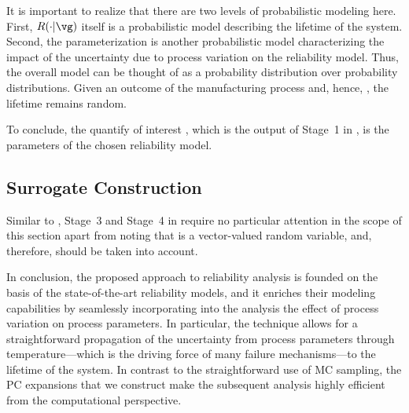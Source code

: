 \begin{remark} 
It is important to realize that there are two levels of probabilistic modeling
here. First, $R(\cdot | \vg)$ itself is a probabilistic model describing the
lifetime of the system. Second, the parameterization \vg is another
probabilistic model characterizing the impact of the uncertainty due to process
variation on the reliability model. Thus, the overall model can be thought of as
a probability distribution over probability distributions. Given an outcome of
the manufacturing process and, hence, \vg, the lifetime remains random.
\end{remark}

To conclude, the quantify of interest \g, which is the output of Stage~1 in
, is the parameters \vg of the chosen reliability model.

\subsection{Surrogate Construction}

Similar to , Stage~3 and Stage~4 in
 require no particular attention in the scope of this
section apart from noting that \vg is a vector-valued random variable, and,
therefore,  should be taken into account.

In conclusion, the proposed approach to reliability analysis is founded on the
basis of the state-of-the-art reliability models, and it enriches their modeling
capabilities by seamlessly incorporating into the analysis the effect of process
variation on process parameters. In particular, the technique allows for a
straightforward propagation of the uncertainty from process parameters through
temperature---which is the driving force of many failure mechanisms---to the
lifetime of the system. In contrast to the straightforward use of \ac{MC}
sampling, the \ac{PC} expansions that we construct make the subsequent analysis
highly efficient from the computational perspective.
